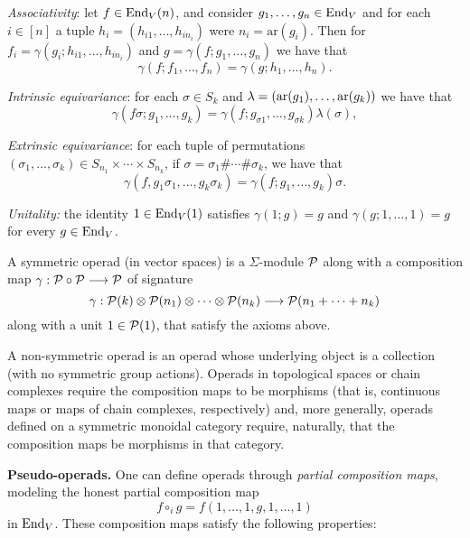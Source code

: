 \begin{tenumerate}
\item \emph{Associativity}: let $f\in \operatorname{End}_V(n)$,
and consider $g_1,\ldots,g_n \in \operatorname{End}_V$ and
for each $i\in [n]$ a tuple $h_i= (h_{i1},\ldots,h_{i n_i})$
were $n_i= \mathrm{ar}(g_i)$. Then for
$f_i = \gamma(g_i; h_{i1},\ldots,h_{in_i})$ 
and $g= \gamma(f; g_1,\ldots,g_n)$ we have
that
\[ \gamma(f;f_1,\ldots,f_n) = 
	\gamma(g; h_1,\ldots,h_n).\]
\item \emph{Intrinsic equivariance}: for
each $\sigma\in S_k$ and $\lambda = (\operatorname{ar}(g_1),\ldots,\operatorname{ar}(g_k))$ we have that
\[ \gamma(f\sigma; g_1,\ldots,g_k) = 	
	\gamma(f; g_{\sigma 1} ,\ldots, 
		g_{\sigma k})\lambda(\sigma),\]
	
\item \emph{Extrinsic equivariance}: for each
tuple of permutations $(\sigma_1,\ldots,\sigma_k) \in S_{n_1} \times
\cdots \times S_{n_k}$, if $\sigma = \sigma_1\#\cdots\#\sigma_k$, we have that
\[\gamma(f,g_1\sigma_1,\ldots,g_k\sigma_k) = 
	\gamma(f; g_1,\ldots,g_k)\sigma.\]
\item \emph{Unitality:} the identity $1\in\operatorname{End}_V(1)$
satisfies $\gamma(1;g) = g$ and $\gamma(g;1,\ldots,1) = g$ for every $g\in\operatorname{End}_V$.
\end{tenumerate}

\begin{definition} 
A symmetric operad (in vector spaces) is a
$\Sigma$-module ${\mathcal{P}}$ along with a composition
map $\gamma : {\mathcal{P}}\circ {\mathcal{P}} \longrightarrow {\mathcal{P}}$
of signature
\[\gamma : {\mathcal{P}}(k)\otimes 
	{\mathcal{P}}(n_1) \otimes \cdots \otimes {\mathcal{P}}(n_k)
	 	\longrightarrow {\mathcal{P}}(n_1+\cdots+n_k)\]
along with a unit $1\in {\mathcal{P}}(1)$, that satisfy
the axioms above. 
\end{definition} 

\begin{variante} A non-symmetric operad is
an operad whose underlying object is a collection
(with no symmetric group actions). Operads in
topological spaces or chain complexes require
the composition maps to be morphisms (that is,
continuous maps or maps of chain complexes,
respectively) and, more generally, operads 
defined on a symmetric monoidal category
require, naturally, that the composition
maps be morphisms in that category. 
\end{variante}

\textbf{Pseudo-operads.}
One can define operads through \emph{partial 
composition maps}, modeling the honest partial
composition map
\[ f\circ_i g = f(1,\ldots,1,g,1,\ldots,1)\] 
in $\operatorname{End}_V$. These composition maps satisfy the
following properties:

